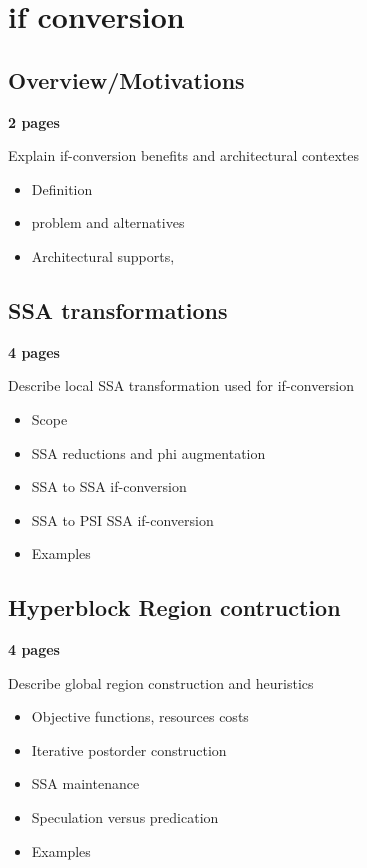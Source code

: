 \chapter{if conversion }

\section{Overview/Motivations}

\textbf{2 pages}

Explain if-conversion benefits and architectural contextes

    \begin{itemize}

    \item Definition 

    \item problem and alternatives

    \item Architectural supports, 

    \end{itemize}

\section{SSA transformations}

\textbf{4 pages}

Describe local SSA transformation used for if-conversion

    \begin{itemize}

    \item Scope

    \item SSA reductions and phi augmentation

    \item SSA to SSA if-conversion

    \item SSA to PSI SSA if-conversion

    \item Examples

    \end{itemize}

\section{Hyperblock Region contruction}

\textbf{4 pages}

Describe global region construction and heuristics

    \begin{itemize}

    \item Objective functions, resources costs

    \item Iterative postorder construction

    \item SSA maintenance

    \item Speculation versus predication

    \item Examples

    \end{itemize}




